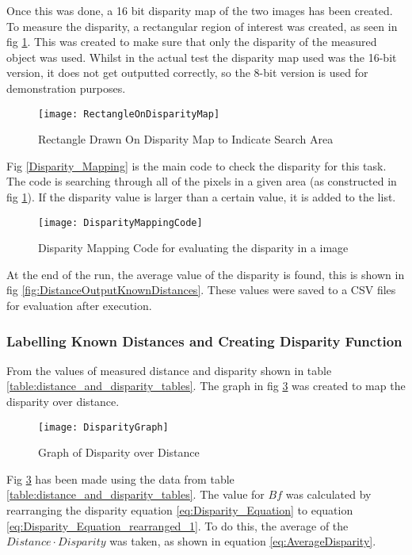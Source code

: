 \documentclass[conference]{IEEEtran}
\begin{document}
Once this was done, a 16 bit disparity map of the two images has been created. To measure the disparity, a rectangular region of interest was created, as seen in fig \ref{fig:RectangleOnDisparityMap}. This was created to make sure that only the disparity of the measured object was used. Whilst in the actual test the disparity map used was the 16-bit version, it does not get outputted correctly, so the 8-bit version is used for demonstration purposes.

\begin{figure}[H]
\centerline{\texttt{[image: RectangleOnDisparityMap]}}
\caption{Rectangle Drawn On Disparity Map to Indicate Search Area}
\label{fig:RectangleOnDisparityMap}
\end{figure}

Fig \ref{Disparity_Mapping} is the main code to check the disparity for this task. The code is searching through all of the pixels in a given area (as constructed in fig \ref{fig:RectangleOnDisparityMap}). If the disparity value is larger than a certain value, it is added to the list. 

\begin{figure}[H]
\centerline{\texttt{[image: DisparityMappingCode]}}
\caption{Disparity Mapping Code for evaluating the disparity in a image}
\label{fig:DisparityMappingCode}
\end{figure}

At the end of the run, the average value of the disparity is found, this is shown in fig \ref{fig:DistanceOutputKnownDistances}. These values were saved to a CSV files for evaluation after execution. 

\subsubsection{Labelling Known Distances and Creating Disparity Function}

From the values of measured distance and disparity shown in table \ref{table:distance_and_disparity_tables}. The graph in fig \ref{fig:DisparityGraph} was created to map the disparity over distance.

\begin{figure}[H]
\centerline{\texttt{[image: DisparityGraph]}}
\caption{Graph of Disparity over Distance }
\label{fig:DisparityGraph}
\end{figure} 

Fig \ref{fig:DisparityGraph} has been made using the data from table \ref{table:distance_and_disparity_tables}. The value for $Bf$ was calculated by rearranging the disparity equation \ref{eq:Disparity_Equation} to equation \ref{eq:Disparity_Equation_rearranged_1}. To do this, the average of the $Distance \cdot Disparity$ was taken, as shown in equation \ref{eq:AverageDisparity}. 
\end{document}
